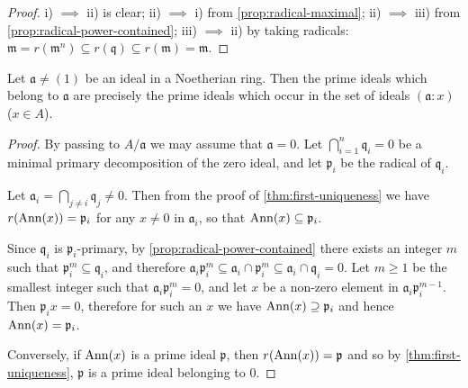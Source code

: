 \begin{proof}
i) $\implies$ ii) is clear; ii) $\implies$ i) from \eqref{prop:radical-maximal}; ii) $\implies$ iii) from \eqref{prop:radical-power-contained}; iii) $\implies$ ii) by taking radicals: $\mathfrak{m} = r(\mathfrak{m}^n) \subseteq r(\mathfrak{q}) \subseteq r(\mathfrak{m}) = \mathfrak{m}$.
\end{proof}

\begin{proposition}\label{prop:associated-primes-annihilators}
Let $\mathfrak{a} \neq (1)$ be an ideal in a Noetherian ring. Then the prime ideals which belong to $\mathfrak{a}$ are precisely the prime ideals which occur in the set of ideals $(\mathfrak{a}:x)$ ($x \in A$).
\end{proposition}

\begin{proof}
By passing to $A/\mathfrak{a}$ we may assume that $\mathfrak{a} = 0$. Let $\bigcap_{i=1}^n \mathfrak{q}_i = 0$ be a minimal primary decomposition of the zero ideal, and let $\mathfrak{p}_i$ be the radical of $\mathfrak{q}_i$.

Let $\mathfrak{a}_i = \bigcap_{j \neq i} \mathfrak{q}_j \neq 0$. Then from the proof of \eqref{thm:first-uniqueness} we have $r(\operatorname{Ann}(x)) = \mathfrak{p}_i$ for any $x \neq 0$ in $\mathfrak{a}_i$, so that $\operatorname{Ann}(x) \subseteq \mathfrak{p}_i$.

Since $\mathfrak{q}_i$ is $\mathfrak{p}_i$-primary, by \eqref{prop:radical-power-contained} there exists an integer $m$ such that $\mathfrak{p}_i^m \subseteq \mathfrak{q}_i$, and therefore $\mathfrak{a}_i \mathfrak{p}_i^m \subseteq \mathfrak{a}_i \cap \mathfrak{p}_i^m \subseteq \mathfrak{a}_i \cap \mathfrak{q}_i = 0$. Let $m \geq 1$ be the smallest integer such that $\mathfrak{a}_i \mathfrak{p}_i^m = 0$, and let $x$ be a non-zero element in $\mathfrak{a}_i \mathfrak{p}_i^{m-1}$. Then $\mathfrak{p}_i x = 0$, therefore for such an $x$ we have $\operatorname{Ann}(x) \supseteq \mathfrak{p}_i$ and hence $\operatorname{Ann}(x) = \mathfrak{p}_i$.

Conversely, if $\operatorname{Ann}(x)$ is a prime ideal $\mathfrak{p}$, then $r(\operatorname{Ann}(x)) = \mathfrak{p}$ and so by \eqref{thm:first-uniqueness}, $\mathfrak{p}$ is a prime ideal belonging to $0$.
\end{proof}


